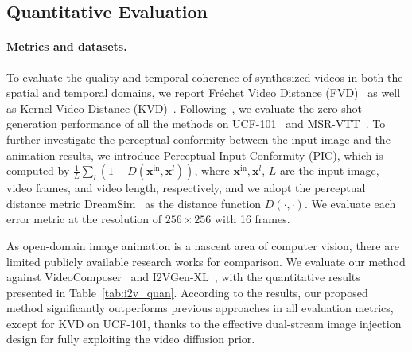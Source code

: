 \subsection{Quantitative Evaluation}
\paragraph{Metrics and datasets.} To evaluate the quality and temporal coherence of synthesized videos in both the spatial and temporal domains, we report Fr\'echet Video Distance (FVD)~\cite{unterthiner2019fvd} as well as Kernel Video Distance (KVD)~\cite{unterthiner2019fvd}.
Following~\cite{zhou2022magicvideo,blattmann2023align}, we evaluate the zero-shot generation performance of all the methods on UCF-101~\cite{soomro2012ucf101} and MSR-VTT~\cite{xu2016msr}.  
To further investigate the perceptual conformity between the input image and the animation results, we introduce Perceptual Input Conformity (PIC), which is computed by $\frac{1}{L}\sum_l (1-D(\mathbf{x}^\text{in},\mathbf{x}^l))$, where $\mathbf{x}^\text{in},\mathbf{x}^l$, $L$ are the input image, video frames, and video length, respectively, and we adopt the perceptual distance metric DreamSim~\cite{fu2023dreamsim} as the distance function $D(\cdot,\cdot)$.
We evaluate each error metric at the resolution of $256\times 256$ with 16 frames.


As open-domain image animation is a nascent area of computer vision, there are limited publicly available research works for comparison. We evaluate our method against VideoComposer~\cite{wang2023videocomposer} and I2VGen-XL~\cite{I2VGen-XL}, with the quantitative results presented in Table~\ref{tab:i2v_quan}. According to the results, our proposed method significantly outperforms previous approaches in all evaluation metrics, except for KVD on UCF-101, thanks to the effective dual-stream image injection design for fully exploiting the video diffusion prior.

